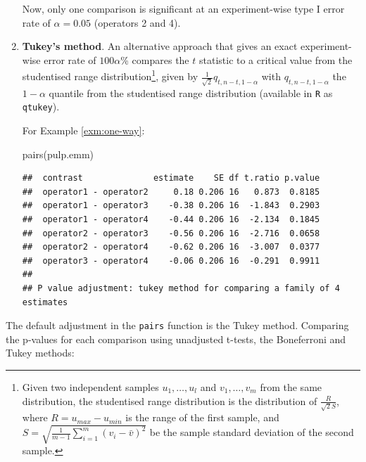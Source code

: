 \documentclass[
]{book}
\newenvironment{Shaded}{\begin{snugshade}}{\end{snugshade}}
\newcommand{\FunctionTok}[1]{\textcolor[rgb]{0.00,0.00,0.00}{#1}}
\newcommand{\NormalTok}[1]{#1}
\theoremstyle{definition}
\theoremstyle{definition}
\theoremstyle{definition}
\theoremstyle{definition}
\theoremstyle{remark}
\begin{document}
\begin{enumerate}
  Now, only one comparison is significant at an experiment-wise type I error rate of \(\alpha = 0.05\) (operators 2 and 4).
\item
  \textbf{Tukey's method}. An alternative approach that gives an exact experiment-wise error rate of \(100\alpha\)\% compares the \(t\) statistic to a critical value from the studentised range distribution\footnote{Given two independent samples \(u_1, \ldots, u_l\) and \(v_1,\ldots,v_m\) from the same distribution, the studentised range distribution is the distribution of \(\frac{R}{\sqrt{2}S}\), where \(R = u_{max}-u_{min}\) is the range of the first sample, and \(S = \sqrt{\frac{1}{m-1}\sum_{i=1}^m(v_i - \bar{v})^2}\) be the sample standard deviation of the second sample.}, given by \(\frac{1}{\sqrt{2}}q_{t, n-t, 1-\alpha}\) with \(q_{t, n-t, 1-\alpha}\) the \(1-\alpha\) quantile from the studentised range distribution (available in \texttt{R} as \texttt{qtukey}).

  For Example \ref{exm:one-way}:

\begin{Shaded}
\begin{Highlighting}[]
\FunctionTok{pairs}\NormalTok{(pulp.emm)}
\end{Highlighting}
\end{Shaded}

\begin{verbatim}
##  contrast              estimate    SE df t.ratio p.value
##  operator1 - operator2     0.18 0.206 16   0.873  0.8185
##  operator1 - operator3    -0.38 0.206 16  -1.843  0.2903
##  operator1 - operator4    -0.44 0.206 16  -2.134  0.1845
##  operator2 - operator3    -0.56 0.206 16  -2.716  0.0658
##  operator2 - operator4    -0.62 0.206 16  -3.007  0.0377
##  operator3 - operator4    -0.06 0.206 16  -0.291  0.9911
## 
## P value adjustment: tukey method for comparing a family of 4 estimates
\end{verbatim}
\end{enumerate}

The default adjustment in the \texttt{pairs} function is the Tukey method. Comparing the p-values for each comparison using unadjusted t-tests, the Boneferroni and Tukey methods:
\end{document}
